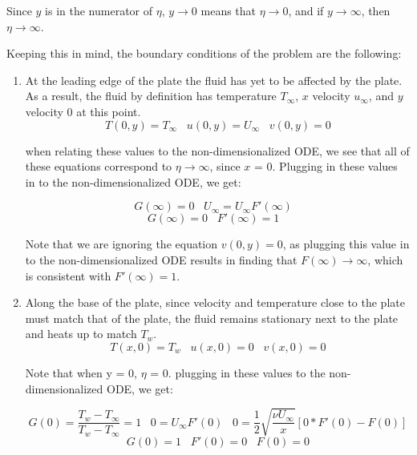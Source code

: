 \documentclass[12pt]{article}\pagestyle{myheadings}
\theoremstyle{plain}
\begin{document}
Since $y$ is in the numerator of $\eta$, $y \rightarrow 0$ means that $\eta \rightarrow 0$, and if $y \rightarrow \infty$, then $\eta \rightarrow \infty$.


\vspace{5mm}
Keeping this in mind, the boundary conditions of the problem are the following: \vspace{5mm}

\begin{enumerate}
\item At the leading edge of the plate the fluid has yet to be affected by the plate. As a result, the fluid by definition has temperature $T_{\infty}$, $x$ velocity $u_{\infty}$, and $y$ velocity 0 at this point.
\begin{equation}\label{eq:leadingEdge}
T(0,y) = T_{\infty}   \,\,\,\,\,  u(0,y) = U_{\infty}    \,\,\,\,\,   v(0,y) = 0 
\end{equation}

when relating these values to the non-dimensionalized ODE, we see that all of these equations correspond to $\eta \rightarrow \infty$, since $x$ = 0. Plugging in these values in to the non-dimensionalized ODE, we get:

\begin{equation}
G(\infty) = 0  \,\,\,\,\,  U_{\infty} = U_{\infty} F'(\infty) \,\,\,\,\, 
\end{equation}
\begin{equation}
G(\infty) = 0  \,\,\,\,\,   F'(\infty) = 1 \,\,\,\,\, 
\end{equation}

Note that we are ignoring the equation $v(0,y) = 0$, as plugging this value in to the non-dimensionalized ODE results in finding that $F(\infty) \rightarrow \infty$, which is consistent with $F'(\infty) = 1$.

\item Along the base of the plate, since velocity and temperature close to the plate must match that of the plate, the fluid remains stationary next to the plate and heats up to match $T_{w}$.
\begin{equation}\label{eq:alongEdge}
T(x,0) = T_{w}   \,\,\,\,\,  u(x,0) = 0    \,\,\,\,\,   v(x,0) = 0
\end{equation}

Note that when y = 0, $\eta$ = 0. plugging in these values to the non-dimensionalized ODE, we get:

\[G(0) = \frac{T_{w}-T_{\infty}}{T_{w}-T_{\infty}} = 1   \,\,\,\,\,  0 = U_{\infty} F'(0)    \,\,\,\,\,    0 = \frac{1}{2} \sqrt{\frac{\nu U_{\infty}}{x}}[0 * F'(0) - F(0)]\]
\begin{equation}
G(0) = 1   \,\,\,\,\,  F'(0) = 0  \,\,\,\,\,  F(0) = 0
\end{equation}



\end{enumerate}
\end{document}
